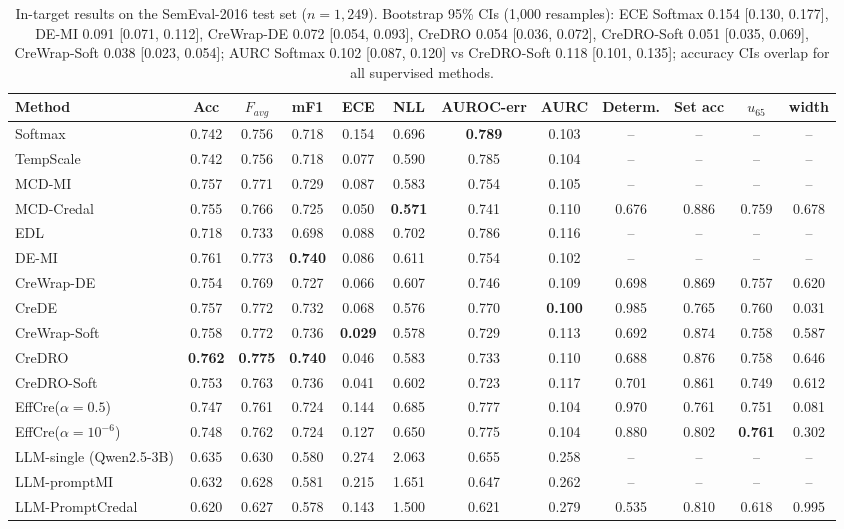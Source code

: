 \documentclass[11pt,a4paper]{article}
\newcommand{\best}[1]{\textbf{#1}}
\begin{document}
\begin{table}[h]
\centering\footnotesize\setlength{\tabcolsep}{3.5pt}
\begin{tabular}{l ccc cc cc ccc c}
\toprule
Method & Acc & $F_{avg}$ & mF1 & ECE & NLL & AUROC-err & AURC & Determ. & Set acc & $u_{65}$ & width \\
\midrule
Softmax & 0.742 & 0.756 & 0.718 & 0.154 & 0.696 & \best{0.789} & 0.103 & -- & -- & -- & -- \\
TempScale \cite{guo2017} & 0.742 & 0.756 & 0.718 & 0.077 & 0.590 & 0.785 & 0.104 & -- & -- & -- & -- \\
MCD-MI & 0.757 & 0.771 & 0.729 & 0.087 & 0.583 & 0.754 & 0.105 & -- & -- & -- & -- \\
MCD-Credal & 0.755 & 0.766 & 0.725 & 0.050 & \best{0.571} & 0.741 & 0.110 & 0.676 & 0.886 & 0.759 & 0.678 \\
EDL & 0.718 & 0.733 & 0.698 & 0.088 & 0.702 & 0.786 & 0.116 & -- & -- & -- & -- \\
DE-MI & 0.761 & 0.773 & \best{0.740} & 0.086 & 0.611 & 0.754 & 0.102 & -- & -- & -- & -- \\
CreWrap-DE & 0.754 & 0.769 & 0.727 & 0.066 & 0.607 & 0.746 & 0.109 & 0.698 & 0.869 & 0.757 & 0.620 \\
CreDE & 0.757 & 0.772 & 0.732 & 0.068 & 0.576 & 0.770 & \best{0.100} & 0.985 & 0.765 & 0.760 & 0.031 \\
CreWrap-Soft & 0.758 & 0.772 & 0.736 & \best{0.029} & 0.578 & 0.729 & 0.113 & 0.692 & 0.874 & 0.758 & 0.587 \\
CreDRO & \best{0.762} & \best{0.775} & \best{0.740} & 0.046 & 0.583 & 0.733 & 0.110 & 0.688 & 0.876 & 0.758 & 0.646 \\
CreDRO-Soft & 0.753 & 0.763 & 0.736 & 0.041 & 0.602 & 0.723 & 0.117 & 0.701 & 0.861 & 0.749 & 0.612 \\
EffCre($\alpha{=}0.5$) & 0.747 & 0.761 & 0.724 & 0.144 & 0.685 & 0.777 & 0.104 & 0.970 & 0.761 & 0.751 & 0.081 \\
EffCre($\alpha{=}10^{-6}$) & 0.748 & 0.762 & 0.724 & 0.127 & 0.650 & 0.775 & 0.104 & 0.880 & 0.802 & \best{0.761} & 0.302 \\
LLM-single (Qwen2.5-3B) & 0.635 & 0.630 & 0.580 & 0.274 & 2.063 & 0.655 & 0.258 & -- & -- & -- & -- \\
LLM-promptMI & 0.632 & 0.628 & 0.581 & 0.215 & 1.651 & 0.647 & 0.262 & -- & -- & -- & -- \\
LLM-PromptCredal & 0.620 & 0.627 & 0.578 & 0.143 & 1.500 & 0.621 & 0.279 & 0.535 & 0.810 & 0.618 & 0.995 \\
\bottomrule
\end{tabular}
\caption{In-target results on the SemEval-2016 test set ($n=1{,}249$). Bootstrap 95\% CIs (1{,}000 resamples): ECE Softmax 0.154 [0.130, 0.177], DE-MI 0.091 [0.071, 0.112], CreWrap-DE 0.072 [0.054, 0.093], CreDRO 0.054 [0.036, 0.072], CreDRO-Soft 0.051 [0.035, 0.069], CreWrap-Soft 0.038 [0.023, 0.054]; AURC Softmax 0.102 [0.087, 0.120] vs CreDRO-Soft 0.118 [0.101, 0.135]; accuracy CIs overlap for all supervised methods.}
\label{tab:e1}
\end{table}
\end{document}
